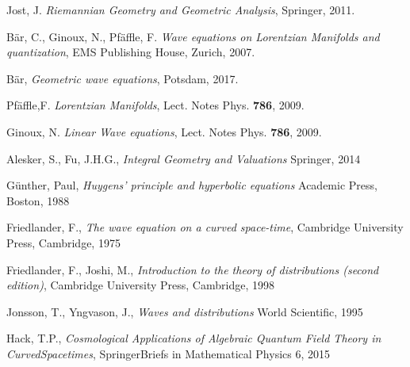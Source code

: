 \documentclass[11pt,a4paper,twoside]{memoir} %
\begin{document}
\begin{thebibliography}{50}
Jost, J.
\textit{Riemannian Geometry and Geometric Analysis},
Springer,
2011.	

B\"{a}r, C., Ginoux, N., Pf\"{a}ffle, F.
\textit{Wave equations on Lorentzian Manifolds and quantization},
EMS Publishing House,
Zurich,
2007.

B\"{a}r,
\textit{Geometric wave equations},
Potsdam,
2017.

Pf\"{a}ffle,F.
\textit{Lorentzian Manifolds},
Lect. Notes Phys. \textbf{786},
2009.

Ginoux, N.
\textit{Linear Wave equations},
Lect. Notes Phys. \textbf{786},
2009.

Alesker, S., Fu, J.H.G.,
\textit{Integral Geometry and Valuations}
Springer, 2014 

G\"unther, Paul,
\textit{Huygens' principle and hyperbolic equations}
Academic Press, Boston, 1988

Friedlander, F., \textit{The wave equation on a curved space-time}, Cambridge University Press, Cambridge, 1975

Friedlander, F., Joshi, M., \textit{ Introduction to the theory of distributions (second
	edition)}, Cambridge University Press, Cambridge, 1998

Jonsson, T., Yngvason, J., \textit{Waves and distributions}
World Scientific, 1995

Hack, T.P., \textit{Cosmological Applications of Algebraic Quantum Field Theory in CurvedSpacetimes}, SpringerBriefs in Mathematical Physics 6, 2015

	
\end{thebibliography}




\printindex %

\end{document}
